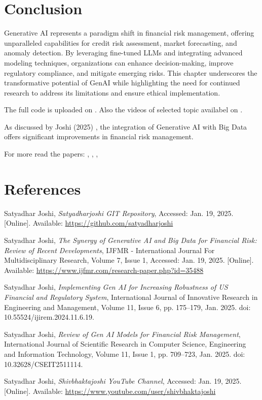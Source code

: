\documentclass[a4paper,headinclude=on,footinclude=on,12pt,oneside]{scrbook}
\begin{document}
\section{Conclusion}

Generative AI represents a paradigm shift in financial risk management, offering unparalleled capabilities for credit risk assessment, market forecasting, and anomaly detection. By leveraging fine-tuned LLMs and integrating advanced modeling techniques, organizations can enhance decision-making, improve regulatory compliance, and mitigate emerging risks. This chapter underscores the transformative potential of GenAI while highlighting the need for continued research to address its limitations and ensure ethical implementation.

The full code is uploaded on \cite{JoshiGit2025}.
Also the videos of selected topic availabel on \cite{JoshiYouTube2025}.

As discussed by Joshi (2025) \cite{JoshiIJFMR2025}, the integration of Generative AI with Big Data offers significant improvements in financial risk management.

For more read the papers: \cite{JoshiCSEIT2025}, \cite{JoshiIJFMR2025}, \cite{JoshiIJFMR2025}, \cite{JoshiIJIREM2025}

\section*{References}
\begin{thebibliography}{9}
	
	
	Satyadhar Joshi, 
	\textit{Satyadharjoshi GIT Repository}, 
	Accessed: Jan. 19, 2025. [Online]. Available: \url{https://github.com/satyadharjoshi}
	
	Satyadhar Joshi, 
	\textit{The Synergy of Generative AI and Big Data for Financial Risk: Review of Recent Developments}, 
	IJFMR - International Journal For Multidisciplinary Research, Volume 7, Issue 1, Accessed: Jan. 19, 2025. [Online]. Available: \url{https://www.ijfmr.com/research-paper.php?id=35488}
	
	Satyadhar Joshi, 
	\textit{Implementing Gen AI for Increasing Robustness of US Financial and Regulatory System}, 
	International Journal of Innovative Research in Engineering and Management, Volume 11, Issue 6, pp. 175–179, Jan. 2025. doi: 10.55524/ijirem.2024.11.6.19.
	
	Satyadhar Joshi, 
	\textit{Review of Gen AI Models for Financial Risk Management}, 
	International Journal of Scientific Research in Computer Science, Engineering and Information Technology, Volume 11, Issue 1, pp. 709–723, Jan. 2025. doi: 10.32628/CSEIT2511114.
	
	Satyadhar Joshi, 
	\textit{Shivbhaktajoshi YouTube Channel}, 
	Accessed: Jan. 19, 2025. [Online]. Available: \url{https://www.youtube.com/user/shivbhaktajoshi}
	
\end{thebibliography}
\end{document}
